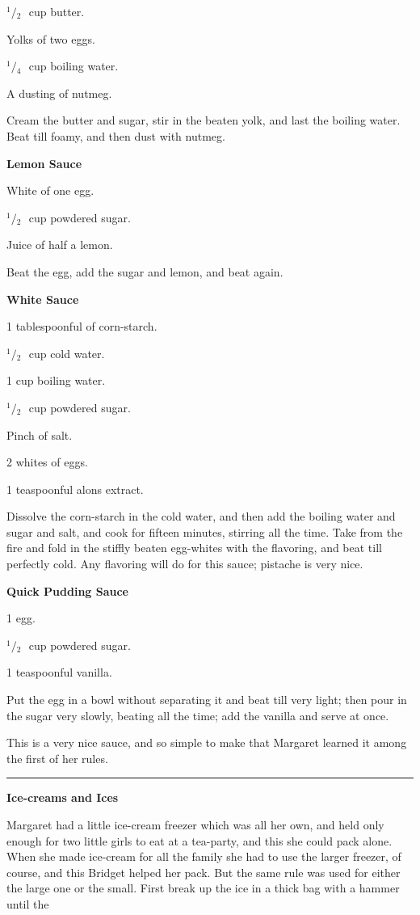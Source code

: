 \documentclass[11pt]{book}
\newcommand{\hstroke}{\rule[0.5ex]{5.0em}{0.2ex}}
\newcommand{\indpar}{\par\noindent\hspace*{\parindent}}
\newcommand{\ingredient}{\indpar}
\newcommand{\instruction}{\indpar}
\newcommand{\OneHalf}{\ensuremath{{}^1\!\!/\!{}_2\mbox{\ }}}
\newcommand{\OneQuarter}{\ensuremath{{}^1\!\!/\!{}_4\mbox{\ }}}
\newenvironment{RecipeTitle}{\medskip\begin{center}\large\bf }{\end{center}\smallskip}
\newenvironment{FoodTypeTitle}{\begin{center}\large\bf }{\end{center}}
\begin{document}
\ingredient  \OneHalf cup butter.
\ingredient  Yolks of two eggs.
\ingredient  \OneQuarter cup boiling water.
\ingredient  A dusting of nutmeg.
\instruction  Cream the butter and sugar, stir in the beaten yolk, and
last the boiling water.  Beat till foamy, and then dust with
nutmeg.
\begin{RecipeTitle}
Lemon Sauce\label{lemon_pudding_sauce}
\end{RecipeTitle}
\ingredient  White of one egg.
\ingredient  \OneHalf cup powdered sugar.
\ingredient  Juice of half a lemon.
\instruction  Beat the egg, add the sugar and lemon, and beat again.
\begin{RecipeTitle}
White Sauce\label{white_pudding_sauce}
\end{RecipeTitle}
\ingredient  1 tablespoonful of corn-starch.
\ingredient  \OneHalf cup cold water.
\ingredient  1 cup boiling water.
\ingredient  \OneHalf cup powdered sugar.
\ingredient  Pinch of salt.
\ingredient  2 whites of eggs.
\ingredient  1 teaspoonful alons extract.
\instruction  Dissolve the corn-starch in the cold water, and then add the
boiling water and sugar and salt, and cook for fifteen
minutes, stirring all the time.  Take from the fire and fold
in the stiffly beaten egg-whites with the flavoring, and beat
till perfectly cold.  Any flavoring will do for this sauce;
pistache is very nice.
\begin{RecipeTitle}
Quick Pudding Sauce\label{quick_pudding_sauce}
\end{RecipeTitle}
\ingredient  1 egg.
\ingredient  \OneHalf cup powdered sugar.
\ingredient  1 teaspoonful vanilla.
\instruction  Put the egg in a bowl without separating it and beat till
very light; then pour in the sugar very slowly, beating all
the time; add the vanilla and serve at once.
\instruction  This is a very nice sauce, and so simple to make that
Margaret learned it among the first of her rules.
\begin{center}
\hstroke
\end{center}
\begin{FoodTypeTitle}
Ice-creams and Ices\label{packing_the_freezer}
\end{FoodTypeTitle}
\instruction  Margaret had a little ice-cream freezer which was all her
own, and held only enough for two little girls to eat at a
tea-party, and this she could pack alone.  When she made
ice-cream for all the family she had to use the larger
freezer, of course, and this Bridget helped her pack.  But the
same rule was used for either the large one or the small.
First break up the ice in a thick bag with a hammer until the
\end{document}
